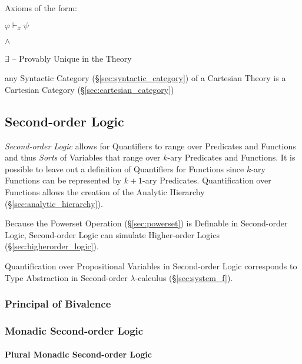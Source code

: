 Axioms of the form:

$\varphi \vdash_{\overline{x}} \psi$

$\wedge$

$\exists$ -- Provably Unique in the Theory

any Syntactic Category (\S\ref{sec:syntactic_category}) of a Cartesian
Theory is a Cartesian Category (\S\ref{sec:cartesian_category})



\subsection{Second-order Logic}\label{sec:secondorder_logic}

\emph{Second-order Logic} allows for Quantifiers to range over
Predicates and Functions and thus \emph{Sorts} of Variables that range
over $k$-ary Predicates and Functions. It is possible to leave out a
definition of Quantifiers for Functions since $k$-ary Functions can be
represented by $k+1$-ary Predicates.\cite{shapiro00} Quantification
over Functions allows the creation of the Analytic Hierarchy
(\S\ref{sec:analytic_hierarchy}).

Because the Powerset Operation (\S\ref{sec:powerset}) is Definable in
Second-order Logic, Second-order Logic can simulate Higher-order
Logics (\S\ref{sec:higherorder_logic}).

Quantification over Propositional Variables in Second-order Logic
corresponds to Type Abstraction in Second-order $\lambda$-calculus
(\S\ref{sec:system_f}).



\subsubsection{Principal of Bivalence}\label{sec:bivalence_principal}

\subsubsection{Monadic Second-order Logic}\label{sec:monadic_secondorder}

\paragraph{Plural Monadic Second-order Logic}\hfill
\label{sec:plural_monadic_secondorder}\hfill \\

